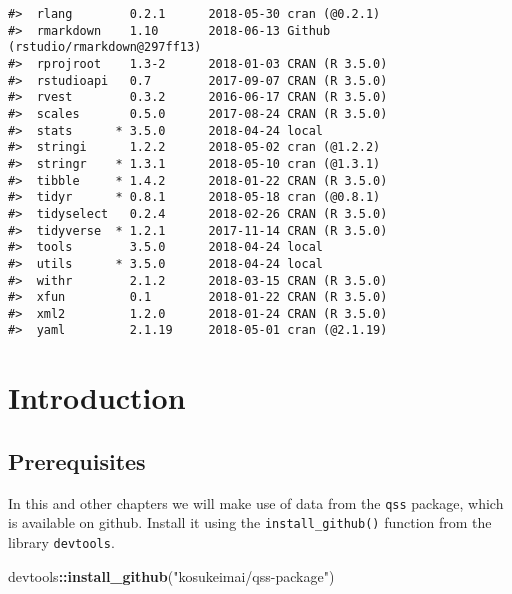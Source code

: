 \documentclass[]{book}
\newenvironment{Shaded}{\begin{snugshade}}{\end{snugshade}}
\newcommand{\KeywordTok}[1]{\textcolor[rgb]{0.13,0.29,0.53}{\textbf{#1}}}
\newcommand{\StringTok}[1]{\textcolor[rgb]{0.31,0.60,0.02}{#1}}
\newcommand{\OperatorTok}[1]{\textcolor[rgb]{0.81,0.36,0.00}{\textbf{#1}}}
\newcommand{\NormalTok}[1]{#1}
\theoremstyle{definition}
\theoremstyle{definition}
\theoremstyle{definition}
\theoremstyle{remark}
\begin{document}
\begin{verbatim}
#>  rlang        0.2.1      2018-05-30 cran (@0.2.1)                     
#>  rmarkdown    1.10       2018-06-13 Github (rstudio/rmarkdown@297ff13)
#>  rprojroot    1.3-2      2018-01-03 CRAN (R 3.5.0)                    
#>  rstudioapi   0.7        2017-09-07 CRAN (R 3.5.0)                    
#>  rvest        0.3.2      2016-06-17 CRAN (R 3.5.0)                    
#>  scales       0.5.0      2017-08-24 CRAN (R 3.5.0)                    
#>  stats      * 3.5.0      2018-04-24 local                             
#>  stringi      1.2.2      2018-05-02 cran (@1.2.2)                     
#>  stringr    * 1.3.1      2018-05-10 cran (@1.3.1)                     
#>  tibble     * 1.4.2      2018-01-22 CRAN (R 3.5.0)                    
#>  tidyr      * 0.8.1      2018-05-18 cran (@0.8.1)                     
#>  tidyselect   0.2.4      2018-02-26 CRAN (R 3.5.0)                    
#>  tidyverse  * 1.2.1      2017-11-14 CRAN (R 3.5.0)                    
#>  tools        3.5.0      2018-04-24 local                             
#>  utils      * 3.5.0      2018-04-24 local                             
#>  withr        2.1.2      2018-03-15 CRAN (R 3.5.0)                    
#>  xfun         0.1        2018-01-22 CRAN (R 3.5.0)                    
#>  xml2         1.2.0      2018-01-24 CRAN (R 3.5.0)                    
#>  yaml         2.1.19     2018-05-01 cran (@2.1.19)
\end{verbatim}

\chapter{Introduction}\label{introduction}

\section*{Prerequisites}\label{prerequisites}

In this and other chapters we will make use of data from the
\texttt{qss} package, which is available on github. Install it using the
\texttt{install\_github()} function from the library \texttt{devtools}.

\begin{Shaded}
\begin{Highlighting}[]
\NormalTok{devtools}\OperatorTok{::}\KeywordTok{install_github}\NormalTok{(}\StringTok{"kosukeimai/qss-package"}\NormalTok{)}
\end{Highlighting}
\end{Shaded}
\end{document}

